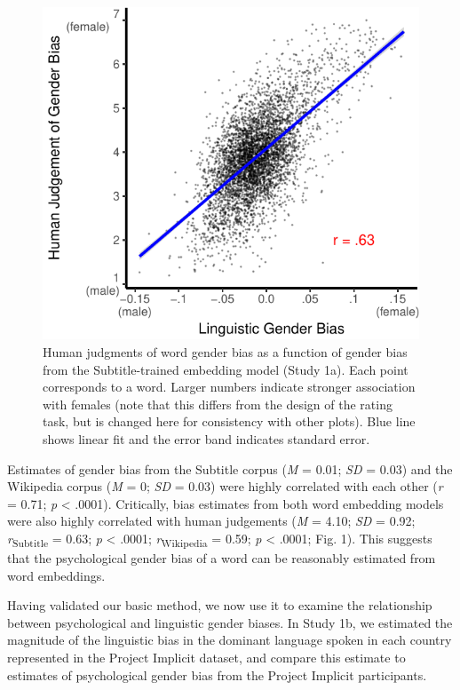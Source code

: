 \documentclass[9pt,twocolumn,twoside]{pnas-new}
\begin{document}
\begin{figure}
\centering
\includegraphics[width=.8\linewidth]{pnas_rmd/iat_lang_pnas_files/figure-latex/unnamed-chunk-10-1.pdf}
\caption{\label{fig:unnamed-chunk-10}Human judgments of word gender bias as
a function of gender bias from the Subtitle-trained embedding model
(Study 1a). Each point corresponds to a word. Larger numbers indicate
stronger association with females (note that this differs from the
design of the rating task, but is changed here for consistency with
other plots). Blue line shows linear fit and the error band indicates
standard error.}
\end{figure}

Estimates of gender bias from the Subtitle corpus (\emph{M} = 0.01;
\emph{SD} = 0.03) and the Wikipedia corpus (\emph{M} = 0; \emph{SD} =
0.03) were highly correlated with each other (\emph{r} = 0.71; \emph{p}
\textless{} .0001). Critically, bias estimates from both word embedding
models were also highly correlated with human judgements (\emph{M} =
4.10; \emph{SD} = 0.92; \emph{r}\textsubscript{Subtitle} = 0.63;
\emph{p} \textless{} .0001; \emph{r}\textsubscript{Wikipedia} = 0.59;
\emph{p} \textless{} .0001; Fig. 1). This suggests that the
psychological gender bias of a word can be reasonably estimated from
word embeddings.


Having validated our basic method, we now use it to examine the relationship
between psychological and linguistic gender biases. In Study 1b, we
estimated the magnitude of the linguistic bias in the dominant language
spoken in each country represented in the Project Implicit dataset, and
compare this estimate to estimates of psychological gender bias from the
Project Implicit participants.
\end{document}

